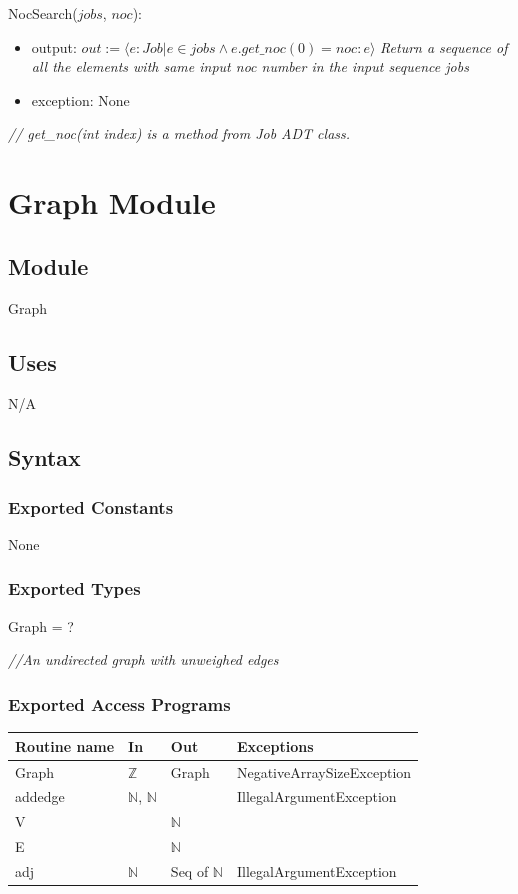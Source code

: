 \documentclass[12pt]{article}
\begin{document}
\noindent NocSearch($jobs$, $noc$):
\begin{itemize}
\item output: $out := \langle e: Job | e \in jobs \wedge e.get\_noc(0) = noc : e \rangle $ \textit{Return a sequence of all the elements with same input noc number in the input sequence jobs}
\item exception: None
\end{itemize}
\noindent \textit{// get\_noc(int index) is a method from Job ADT class.}\\

\newpage


\section* {Graph Module}

\subsection*{Module}

Graph

\subsection* {Uses}

N/A

\subsection* {Syntax}

\subsubsection* {Exported Constants}

None

\subsubsection* {Exported Types}

Graph = ?

\noindent \textit{//An undirected graph with unweighed edges}

\subsubsection* {Exported Access Programs}

\begin{tabular}{| l | l | l | l |}
\hline
\textbf{Routine name} & \textbf{In} & \textbf{Out} & \textbf{Exceptions}\\
\hline
Graph & $\mathbb{Z}$ & Graph & NegativeArraySizeException\\
\hline
addedge & $\mathbb{N}$, $\mathbb{N}$ & ~ & IllegalArgumentException\\
\hline
V & ~ & $\mathbb{N}$ & ~\\
\hline
E & ~ & $\mathbb{N}$ & ~\\
\hline
adj & $\mathbb{N}$ & Seq of $\mathbb{N}$ & IllegalArgumentException\\
\hline
\end{tabular}
\end{document}
